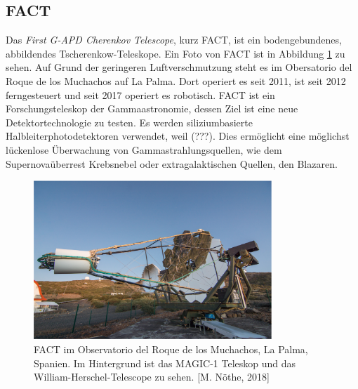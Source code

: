 \subsection{FACT}
Das \textit{First G-APD Cherenkov Telescope}, \cite{Anderhub_2013} kurz FACT, ist ein bodengebundenes, abbildendes Tscherenkow-Teleskope. Ein Foto von FACT ist in Abbildung \ref{fig:FACT} zu sehen. Auf Grund der geringeren Luftverschmutzung steht es im Obersatorio del Roque de los Muchachos auf La Palma. Dort operiert es seit 2011, ist seit 2012 ferngesteuert und seit 2017 operiert es robotisch. FACT ist ein Forschungsteleskop der Gammaastronomie, dessen Ziel ist eine neue Detektortechnologie zu testen. Es werden siliziumbasierte Halbleiterphotodetektoren verwendet, weil (???). Dies ermöglicht eine möglichst lückenlose Überwachung von Gammastrahlungsquellen, wie dem Supernovaüberrest Krebsnebel oder extragalaktischen Quellen, den Blazaren.
\begin{figure}
  \centering
  \includegraphics[width=0.8\textwidth]{graphics/Max.png}
  \caption{ FACT im Observatorio del Roque de los Muchachos, La Palma, Spanien. Im Hintergrund ist das MAGIC-1 Teleskop und das William-Herschel-Telescope zu sehen. [M. Nöthe, 2018]}
  \label{fig:FACT}
\end{figure}

